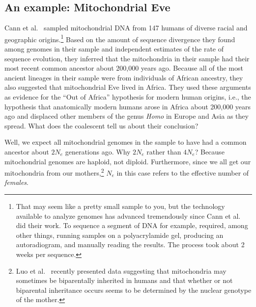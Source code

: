 \subsection*{An example: Mitochondrial
  Eve}

Cann et al.~\cite{Cann-etal-1987} sampled mitochondrial DNA from 147
humans of diverse racial and geographic origins.\footnote{That may
  seem like a pretty small sample to you, but the technology
  available to analyze genomes has advanced tremendously since Cann et
  al. did their work. To sequence a segment of DNA for example,
  required, among other things, running samples on a polyacrylamide
  gel, producing an autoradiogram, and manually reading the
  results. The process took about 2 weeks per sequence.}  Based on the
amount of sequence divergence they found among genomes in their sample
and independent estimates of the rate of sequence evolution, they
inferred that the mitochondria in their sample had their most recent
common ancestor about 200,000 years ago. Because all of the most
ancient lineages in their sample were from individuals of African
ancestry, they also suggested that mitochondrial Eve lived in
Africa. They used these arguments as evidence for the ``Out of
Africa'' hypothesis for modern human origins, i.e., the hypothesis
that anatomically modern humans arose in Africa about 200,000 years
ago and displaced other members of the genus {\it Homo\/} in Europe
and Asia as they spread. What does the coalescent tell us about their
conclusion?

Well, we expect all mitochondrial genomes in the sample to have had a
common ancestor about $2N_e$ generations ago. Why $2N_e$ rather than
$4N_e$? Because mitochondrial genomes are haploid, not
diploid. Furthermore, since we all get our mitochondria from our
mothers,\footnote{Luo et al.~\cite{Luo-etal-2018} recently presented
  data suggesting that mitochondria may sometimes be biparentally
  inherited in humans and that whether or not biparental inheritance
  occurs seems to be determined by the nuclear genotype of the
  mother.} $N_e$ in this case refers to the effective number of {\it
  females}.

